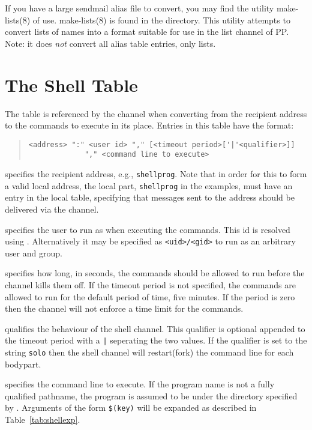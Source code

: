 If you have a large sendmail alias file to convert, you may find the utility 
\man make-lists(8) of use.
\man make-lists(8) is found in the  directory. This utility
attempts to 
convert lists of names into a format suitable for use in the list channel
of PP. Note: it does {\em not} convert all alias table entries, only lists.

\section {The Shell Table}\label{sect:shell}

The  table is referenced by the  channel
when converting from the recipient address to the commands to execute
in its place.  Entries in this table have the format:

\begin{quote}\begin{verbatim}
<address> ":" <user id> "," [<timeout period>['|'<qualifier>]] 
             "," <command line to execute>
\end{verbatim}\end{quote}

\begin{describe}

\item[\verb+address+:] specifies the  recipient address, e.g.,
\verb+shellprog+.
Note that in order for this to form a valid local address, the local
part, \verb+shellprog+ in the examples, must have an entry in the
local  table, specifying that messages sent to the address
should be delivered via the  channel.

\item[\verb+user id+:] specifies the user to run as when executing the
commands.  This id is resolved using
. Alternatively it may be
specified as \verb|<uid>/<gid>| to run as an arbitrary user and group.

\item[\verb+timeout period+:]
specifies how long, in seconds, the commands should be allowed to run
before the  channel kills them off.  If the timeout period
is not specified, the commands are allowed to run for the default
period of time, five minutes.  If the period is zero then the
 channel will not enforce a time limit for the commands.

\item[\verb+qualifier+:]
qualifies the behaviour of the shell channel.
This qualifier is optional appended to the timeout period with a
\verb+|+ seperating the two values.
If the qualifier is set to the string \verb+solo+ then the shell
channel will restart(fork) the command line for each bodypart.

\item[\verb+command line+:]
specifies the command line to execute.  If the program name is not a
fully qualified pathname, the program is assumed to be under the
directory specified by .  Arguments of the form
\verb+$(key)+ will be expanded as described in
Table~\ref{tab:shellexp}.

\end{describe}

